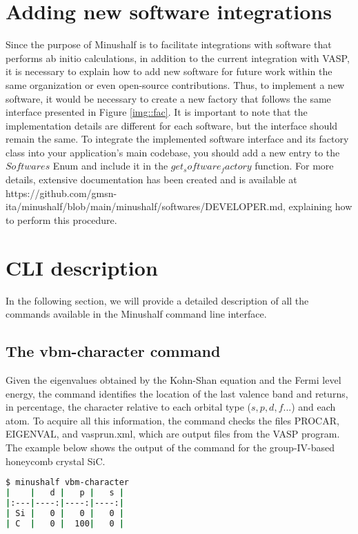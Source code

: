 \section{Adding new software integrations}
Since the purpose of Minushalf is to facilitate integrations with software that performs ab initio calculations, in addition to the current integration with VASP, it is necessary to explain how to add new software for future work within the same organization or even open-source contributions. Thus, to implement a new software, it would be necessary to create a new factory that follows the same interface presented in Figure \ref{img::fac}. It is important to note that the implementation details are different for each software, but the interface should remain the same. To integrate the implemented software interface and its factory class into your application's main codebase, you should add a new entry to the $Softwares$ Enum and include it in the $get_software_factory$ function. For more details, extensive documentation has been created and is available at https://github.com/gmsn-ita/minushalf/blob/main/minushalf/softwares/DEVELOPER.md, explaining how to perform this procedure.



\section{CLI description}
In the following section, we will provide a detailed description of all the commands available in the Minushalf command line interface.
\subsection{The vbm-character command}
\label{vbm}
Given the eigenvalues obtained by the Kohn-Shan equation and the Fermi level energy, the command identifies the location of the last valence band and returns, in percentage, the character relative to each orbital type ($ s, p, d, f ... $) and each atom. To acquire all this information, the command checks the files PROCAR, EIGENVAL, and vasprun.xml, which are output files from the VASP program. The example below shows the output of the command for the group-IV-based honeycomb crystal SiC.

\begin{lstlisting}[language=bash,caption={Example of the vbm-character for SiC-2D}]
$ minushalf vbm-character
|    |   d |   p |   s |
|:---|----:|----:|----:|
| Si |   0 |   0 |   0 |
| C  |   0 |  100|   0 |
\end{lstlisting}


